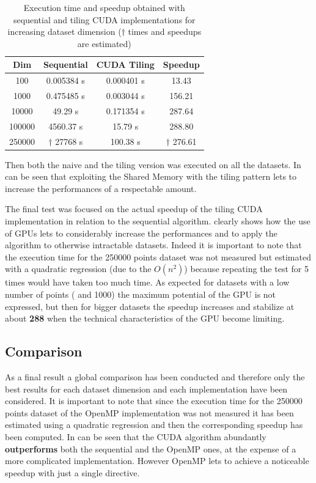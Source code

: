 \documentclass[10pt,twocolumn,letterpaper]{article}
\begin{document}
\begin{table}[]
\centering
\begin{tabular}{|c|c|c|c|}
\hline
\textbf{Dim} & \textbf{Sequential} & \textbf{CUDA Tiling} & \textbf{Speedup} \\ \hline
100 & 0.005384 s & 0.000401 s & 13.43 \\ \hline
1000 & 0.475485 s & 0.003044 s & 156.21 \\ \hline
10000 & 49.29 s & 0.171354 s & 287.64 \\ \hline
100000 & 4560.37 s & 15.79 s & 288.80 \\ \hline
250000 & $\dagger$ 27768 s & 100.38 s & $\dagger$ 276.61 \\ \hline
\end{tabular}
\caption{Execution time and speedup obtained with sequential and tiling CUDA implementations for increasing dataset dimension ($\dagger$ times and speedups are estimated)}
\label{tab:cudaSpeedup}
\end{table}

Then both the naive and the tiling version was executed on all the datasets. In \emph{} can be seen that exploiting the Shared Memory with the tiling pattern lets to increase the performances of a respectable amount.

The final test was focused on the actual speedup of the tiling CUDA implementation in relation to the sequential algorithm. \emph{} clearly shows how the use of GPUs lets to considerably increase the performances and to apply the algorithm to otherwise intractable datasets. Indeed it is important to note that the execution time for the 250000 points dataset was not measured but estimated with a quadratic regression (due to the $O(n^{2})$) because repeating the test for 5 times would have taken too much time. As expected for datasets with a low number of points ( and 1000) the maximum potential of the GPU is not expressed, but then for bigger datasets the speedup increases and stabilize at about \textbf{288} when the technical characteristics of the GPU become limiting.


\subsection{Comparison}

As a final result a global comparison has been conducted and therefore only the best results for each dataset dimension and each implementation have been considered. It is important to note that since the execution time for the 250000 points dataset of the OpenMP implementation was not measured it has been estimated using a quadratic regression and then the corresponding speedup has been computed. In \emph{} can be seen that the CUDA algorithm abundantly \textbf{outperforms} both the sequential and the OpenMP ones, at the expense of a more complicated implementation. However OpenMP lets to achieve a noticeable speedup with just a single directive.
\end{document}
